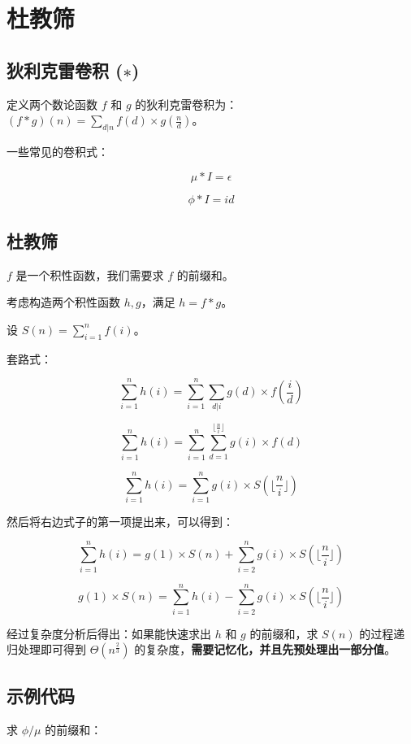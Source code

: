 \section{杜教筛}

\subsection{狄利克雷卷积 ($∗$)}

定义两个数论函数 $f$ 和 $g$ 的狄利克雷卷积为：$(f*g)(n)=\sum_{d|n}f(d) \times g(\frac{n}{d})$。

一些常见的卷积式：

$$\mu*I=\epsilon$$

$$\phi*I=id$$

\subsection{杜教筛}

$f$ 是一个积性函数，我们需要求 $f$ 的前缀和。

考虑构造两个积性函数 $h,g$，满足 $h=f*g$。

设 $S(n)=\sum_{i=1}^n f(i)$。

套路式：

$$\sum_{i=1}^n h(i)=\sum_{i=1}^n\sum_{d|i}g(d) \times f(\frac{i}{d})$$

$$\sum_{i=1}^n h(i)=\sum_{i=1}^n\sum_{d=1}^{\lfloor\frac{n}{i}\rfloor} g(i) \times f(d)$$

$$\sum_{i=1}^n h(i)=\sum_{i=1}^n g(i) \times S(\lfloor \frac{n}{i} \rfloor)$$

然后将右边式子的第一项提出来，可以得到：

$$\sum_{i=1}^n h(i)=g(1) \times S(n)+\sum_{i=2}^n g(i) \times S(\lfloor \frac{n}{i} \rfloor)$$

$$g(1) \times S(n)=\sum_{i=1}^n h(i)-\sum_{i=2}^n g(i) \times S(\lfloor \frac{n}{i} \rfloor)$$

经过复杂度分析后得出：如果能快速求出 $h$ 和 $g$ 的前缀和，求 $S(n)$ 的过程递归处理即可得到 $\Theta(n^{\frac{2}{3}})$ 的复杂度，\textbf{需要记忆化，并且先预处理出一部分值}。

\subsection{示例代码}

求 $\phi/\mu$ 的前缀和：


